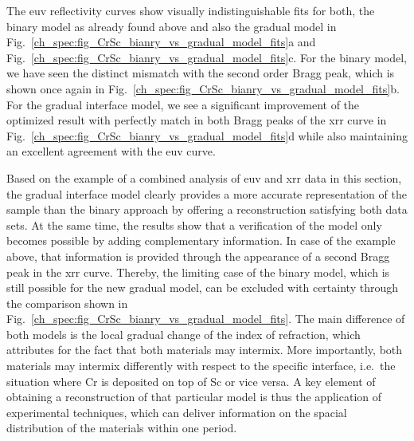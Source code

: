 The \gls{euv} reflectivity curves show visually indistinguishable fits for both, the binary model as already found above and also the gradual model in Fig.~\ref{ch_spec:fig_CrSc_bianry_vs_gradual_model_fits}a and Fig.~\ref{ch_spec:fig_CrSc_bianry_vs_gradual_model_fits}c. For the binary model, we have seen the distinct mismatch with the second order Bragg peak, which is shown once again in Fig.~\ref{ch_spec:fig_CrSc_bianry_vs_gradual_model_fits}b. For the gradual interface model, we see a significant improvement of the optimized result with perfectly match in both Bragg peaks of the \gls{xrr} curve in Fig.~\ref{ch_spec:fig_CrSc_bianry_vs_gradual_model_fits}d while also maintaining an excellent agreement with the \gls{euv} curve.

Based on the example of a combined analysis of \gls{euv} and \gls{xrr} data in this section, the gradual interface model clearly provides a more accurate representation of the sample than the binary approach by offering a reconstruction satisfying both data sets. At the same time, the results show that a verification of the model only becomes possible by adding complementary information. In case of the example above, that information is provided through the appearance of a second Bragg peak in the \gls{xrr} curve. Thereby, the limiting case of the binary model, which is still possible for the new gradual model, can be excluded with certainty through the comparison shown in Fig.~\ref{ch_spec:fig_CrSc_bianry_vs_gradual_model_fits}. The main difference of both models is the local gradual change of the index of refraction, which attributes for the fact that both materials may intermix. More importantly, both materials may intermix differently with respect to the specific interface, i.e.~the situation where Cr is deposited on top of Sc or vice versa. A key element of obtaining a reconstruction of that particular model is thus the application of experimental techniques, which can deliver information on the spacial distribution of the materials within one period.

